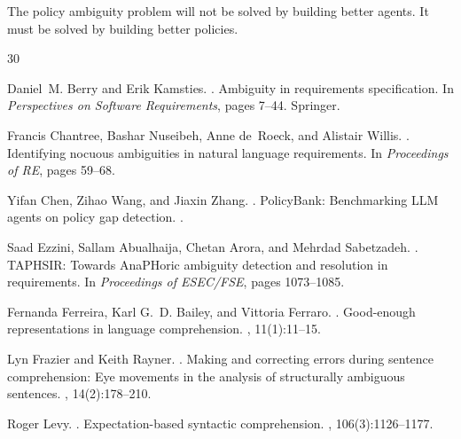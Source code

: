 \documentclass[11pt]{article}
\begin{document}
The policy ambiguity problem will not be solved by building better agents. It must be solved by building better policies.




\begin{thebibliography}{30}

Daniel~M. Berry and Erik Kamsties.
.
\newblock Ambiguity in requirements specification.
\newblock In {\em Perspectives on Software Requirements}, pages 7--44. Springer.

Francis Chantree, Bashar Nuseibeh, Anne de~Roeck, and Alistair Willis.
.
\newblock Identifying nocuous ambiguities in natural language requirements.
\newblock In {\em Proceedings of RE}, pages 59--68.

Yifan Chen, Zihao Wang, and Jiaxin Zhang.
.
\newblock PolicyBank: Benchmarking LLM agents on policy gap detection.
.

Saad Ezzini, Sallam Abualhaija, Chetan Arora, and Mehrdad Sabetzadeh.
.
\newblock TAPHSIR: Towards AnaPHoric ambiguity detection and resolution in requirements.
\newblock In {\em Proceedings of ESEC/FSE}, pages 1073--1085.

Fernanda Ferreira, Karl G.~D. Bailey, and Vittoria Ferraro.
.
\newblock Good-enough representations in language comprehension.
, 11(1):11--15.

Lyn Frazier and Keith Rayner.
.
\newblock Making and correcting errors during sentence comprehension: Eye movements in the analysis of structurally ambiguous sentences.
, 14(2):178--210.

Roger Levy.
.
\newblock Expectation-based syntactic comprehension.
, 106(3):1126--1177.


\end{thebibliography}
\end{document}
